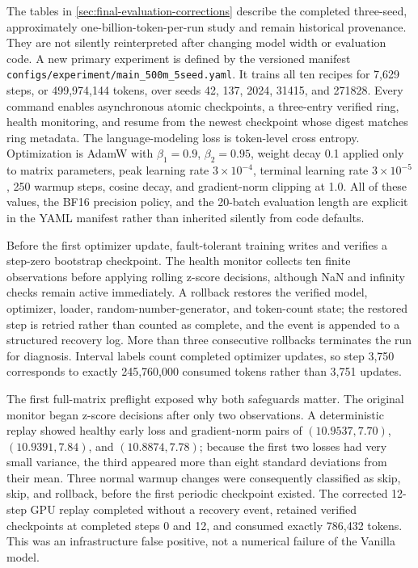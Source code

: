 \documentclass[11pt,a4paper]{article}
\theoremstyle{definition}
\theoremstyle{plain}
\begin{document}
The tables in \cref{sec:final-evaluation-corrections} describe the completed
three-seed, approximately one-billion-token-per-run study and remain historical
provenance.  They are not silently reinterpreted after changing model width or
evaluation code.  A new primary experiment is defined by the versioned manifest
\texttt{configs/experiment/main\_500m\_5seed.yaml}.  It trains all ten recipes for
7,629 steps, or 499,974,144 tokens, over seeds 42, 137, 2024, 31415, and 271828.
Every command enables asynchronous atomic checkpoints, a three-entry verified ring,
health monitoring, and resume from the newest checkpoint whose digest matches ring
metadata.  The language-modeling loss is token-level cross entropy.  Optimization is
AdamW with $\beta_1=0.9$, $\beta_2=0.95$, weight decay 0.1 applied only to matrix
parameters, peak learning rate $3\times10^{-4}$, terminal learning rate
$3\times10^{-5}$, 250 warmup steps, cosine decay, and gradient-norm clipping at 1.0.
All of these values, the BF16 precision policy, and the 20-batch evaluation length
are explicit in the YAML manifest rather than inherited silently from code defaults.

Before the first optimizer update, fault-tolerant training writes and verifies a
step-zero bootstrap checkpoint.  The health monitor collects ten finite observations
before applying rolling z-score decisions, although NaN and infinity checks remain
active immediately.  A rollback restores the verified model, optimizer, loader,
random-number-generator, and token-count state; the restored step is retried rather
than counted as complete, and the event is appended to a structured recovery log.
More than three consecutive rollbacks terminates the run for diagnosis.  Interval
labels count completed optimizer updates, so step 3,750 corresponds to exactly
245,760,000 consumed tokens rather than 3,751 updates.

The first full-matrix preflight exposed why both safeguards matter.  The original
monitor began z-score decisions after only two observations.  A deterministic replay
showed healthy early loss and gradient-norm pairs of $(10.9537,7.70)$,
$(10.9391,7.84)$, and $(10.8874,7.78)$; because the first two losses had very small
variance, the third appeared more than eight standard deviations from their mean.
Three normal warmup changes were consequently classified as skip, skip, and rollback,
before the first periodic checkpoint existed.  The corrected 12-step GPU replay
completed without a recovery event, retained verified checkpoints at completed steps
0 and 12, and consumed exactly 786,432 tokens.  This was an infrastructure false
positive, not a numerical failure of the Vanilla model.
\end{document}

